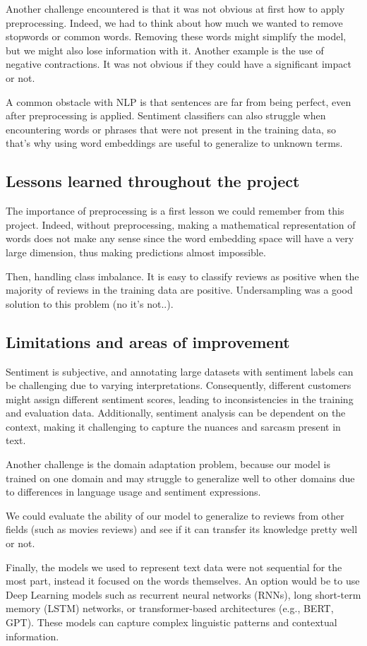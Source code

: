 \documentclass{article}
\begin{document}
Another challenge encountered is that it was not obvious at first how to apply preprocessing. Indeed, we had to think about how much we wanted to remove stopwords or common words. Removing these words might simplify the model, but we might also lose information with it. Another example is the use of negative contractions. It was not obvious if they could have a significant impact or not.

A common obstacle with NLP is that sentences are far from being perfect, even after preprocessing is applied. Sentiment classifiers can also struggle when encountering words or phrases that were not present in the training data, so that's why using word embeddings are useful to generalize to unknown terms. 

\subsection{Lessons learned throughout the project}

The importance of preprocessing is a first lesson we could remember from this project. Indeed, without preprocessing, making a mathematical representation of words does not make any sense since the word embedding space will have a very large dimension, thus making predictions almost impossible.

Then, handling class imbalance. It is easy to classify reviews as positive when the majority of reviews in the training data are positive. Undersampling was a good solution to this problem (no it's not..). 

\subsection{Limitations and areas of improvement}

Sentiment is subjective, and annotating large datasets with sentiment labels can be challenging due to varying interpretations. Consequently, different customers might assign different sentiment scores, leading to inconsistencies in the training and evaluation data. Additionally, sentiment analysis can be dependent on the context, making it challenging to capture the nuances and sarcasm present in text. 

Another challenge is the domain adaptation problem, because our model is trained on one domain and may struggle to generalize well to other domains due to differences in language usage and sentiment expressions.

We could evaluate the ability of our model to generalize to reviews from other fields (such as movies reviews) and see if it can transfer its knowledge pretty well or not.

Finally, the models we used to represent text data were not sequential for the most part, instead it focused on the words themselves. An option would be to use Deep Learning models such as recurrent neural networks (RNNs), long short-term memory (LSTM) networks, or transformer-based architectures (e.g., BERT, GPT). These models can capture complex linguistic patterns and contextual information. 



\printbibliography
\end{document}
